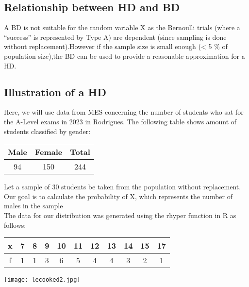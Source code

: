 \documentclass{article}
\begin{document}
\subsection{Relationship between HD and BD}
A BD is not suitable for the random variable X as the Bernoulli trials
(where a “success” is represented by Type A) are dependent 
(since sampling is done without replacement).However if the sample 
size is small enough (< 5 \% of population size),the BD can be used 
to provide a reasonable approximation for a HD.

\subsection{Illustration of a HD}
Here, we will use data from MES concerning the number of students
who sat for the A-Level exams in 2023 in Rodrigues. The following
table shows amount of students classified by gender:

\begin{center}
  \begin{tabular}{|c|c|c|}
    \hline
    \textbf{Male} & \textbf{Female} & \textbf{Total} \\
    \hline
    \hline
    94 & 150 & 244 \\
    \hline
  \end{tabular}
\end{center}

Let a sample of 30 students be taken from the population without
replacement. Our goal is to calculate the probability of X, which
represents the number of males in the sample \\


The data for our distribution was generated using the 
rhyper function in R as follows:

\begin{center}
  \begin{tabular}{|c|c|c|c|c|c|c|c|c|c|c|}
    \hline
    x & 7 & 8 & 9 & 10 & 11 & 12 & 13 & 14 & 15 & 17 \\
    \hline
    f & 1 & 1 & 3 & 6 & 5 & 4 & 4 & 3 & 2 & 1 \\
    \hline
  \end{tabular}
\end{center}

\begin{center}
  \texttt{[image: lecooked2.jpg]}
\end{center}
\end{document}
